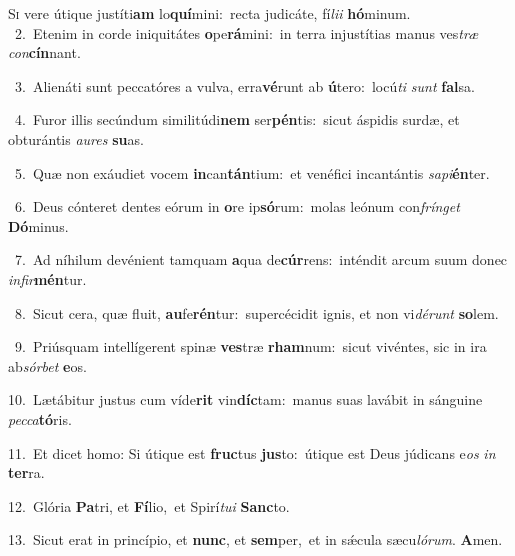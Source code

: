 \lettrine{\initial\textcolor{\initialcolor}{S}}{i} vere útique justíti\textbf{am} lo\-\textbf{quí}\-mini:~\star recta judicáte, fí\-\textit{li}\-\textit{i} \textbf{hó}\-minum.\\
{\numbfont\textcolor{\numbcolor}{~2.}}~Etenim in corde iniquitátes \textbf{o}\-pe\-\textbf{rá}\-mini:~\star in terra injustítias manus ves\textit{træ} \textit{con}\-\textbf{cín}nant.\par
{\numbfont\textcolor{\numbcolor}{~3.}}~Alienáti sunt peccatóres a vulva, erra\-\textbf{vé}\-runt ab \textbf{ú}\-tero:~\star locú\textit{ti} \textit{sunt} \textbf{fal}\-sa.\par
{\numbfont\textcolor{\numbcolor}{~4.}}~Furor illis secúndum similitúdi\textbf{nem} ser\-\textbf{pén}\-tis:~\star sicut áspidis surdæ, et obturántis \textit{au}\-\textit{res} \textbf{su}\-as.\par
{\numbfont\textcolor{\numbcolor}{~5.}}~Quæ non exáudiet vocem \textbf{in}\-can\-\textbf{tán}\-tium:~\star et venéfici incantántis \textit{sa}\-\textit{pi}\textbf{én}ter.\par
{\numbfont\textcolor{\numbcolor}{~6.}}~Deus cónteret dentes eórum in \textbf{o}\-re ip\-\textbf{só}\-rum:~\star molas leónum con\-\textit{frín}\-\textit{get} \textbf{Dó}\-minus.\par
{\numbfont\textcolor{\numbcolor}{~7.}}~Ad níhilum devénient tamquam \textbf{a}\-qua de\-\textbf{cúr}\-rens:~\star inténdit arcum suum donec \textit{in}\-\textit{fir}\textbf{mén}tur.\par
{\numbfont\textcolor{\numbcolor}{~8.}}~Sicut cera, quæ fluit, \textbf{au}\-fe\-\textbf{rén}\-tur:~\star supercécidit ignis, et non vi\-\textit{dé}\-\textit{runt} \textbf{so}\-lem.\par
{\numbfont\textcolor{\numbcolor}{~9.}}~Priúsquam intellígerent spinæ \textbf{ves}\-træ \textbf{rham}\-num:~\star sicut vivéntes, sic in ira ab\-\textit{sór}\-\textit{bet} \textbf{e}\-os.\par
{\numbfont\textcolor{\numbcolor}{10.}}~Lætábitur justus cum víde\textbf{rit} vin\-\textbf{díc}\-tam:~\star manus suas lavábit in sánguine \textit{pec}\-\textit{ca}\textbf{tó}ris.\par
{\numbfont\textcolor{\numbcolor}{11.}}~Et dicet homo: Si útique est \textbf{fruc}\-tus \textbf{jus}\-to:~\star útique est Deus júdicans e\textit{os} \textit{in} \textbf{ter}\-ra.\par
{\numbfont\textcolor{\numbcolor}{12.}}~Glória \textbf{Pa}\-tri, et \textbf{Fí}\-lio,~\star et Spirí\-\textit{tu}\-\textit{i} \textbf{Sanc}\-to.\par
{\numbfont\textcolor{\numbcolor}{13.}}~Sicut erat in princípio, et \textbf{nunc}\-, et \textbf{sem}\-per,~\star et in sǽcula sæcu\-\textit{ló}\-\textit{rum}. \textbf{A}\-men.\par
